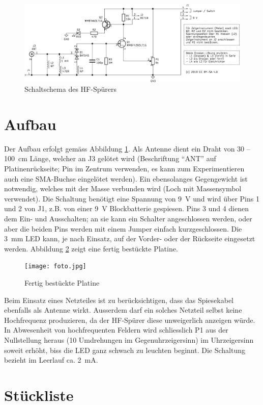 \documentclass[a4paper,11pt,halfparskip,smallheadings,DIV=10]{scrartcl}
\begin{document}
\begin{figure}
\includegraphics[width=\textwidth]{schaltung.pdf}
\caption{Schaltschema des HF-Spürers}
\label{fig:schematic}
\end{figure}

\section{Aufbau}
Der Aufbau erfolgt gemäss Abbildung \ref{fig:schematic}. Als Antenne dient ein
Draht von 30 -- 100~cm Länge, welcher an J3 gelötet wird (Beschriftung ``ANT''
auf Platinenrückseite; Pin im Zentrum verwenden, es kann zum Experimentieren
auch eine SMA-Buchse eingelötet werden).
Ein ebensolanges Gegengewicht ist notwendig, welches mit der Masse
verbunden wird (Loch mit Massensymbol verwendet). Die Schaltung benötigt eine Spannung von
9~V und wird über Pins 1 und 2 von J1, z.B. von einer 9~V Blockbatterie
gespiesen. Pins 3 und 4 dienen dem Ein- und Ausschalten; an sie kann ein Schalter
angeschlossen werden, oder aber die beiden Pins werden mit einem Jumper einfach
kurzgeschlossen. Die 3~mm LED kann, je nach Einsatz, auf der Vorder- oder der
Rückseite eingesetzt werden.  Abbildung \ref{fig:aufbau} zeigt eine fertig
bestückte Platine.

\begin{figure}[H]
\texttt{[image: foto.jpg]}
\caption{Fertig bestückte Platine}
\label{fig:aufbau}
\end{figure}

Beim Einsatz eines
Netzteiles ist zu berücksichtigen, dass das Spiesekabel ebenfalls als Antenne
wirkt. Ausserdem darf ein solches Netzteil selbst keine Hochfrequenz produzieren,
da der HF-Spürer diese unweigerlich anzeigen würde. In Abwesenheit von
hochfrequenten Feldern wird schliesslich P1 aus der Nullstellung heraus (10 
Umdrehungen im Gegenuhrzeigersinn) im Uhrzeigersinn soweit erhöht, biss die LED
ganz schwach zu leuchten beginnt. Die Schaltung bezieht im Leerlauf ca. 2~mA.

\section{Stückliste}
\end{document}
